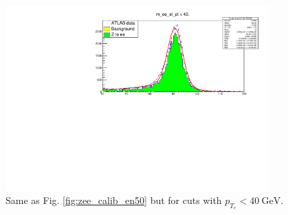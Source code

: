 \documentclass[a4paper]{report}
\numberwithin{equation}{section}
\begin{document}
\begin{figure}[htpb]
    \centering
    \includegraphics[width=0.9\textwidth]{zeefit_elpt40.pdf}
    \caption{Same as Fig. \ref*{fig:zee_calib_en50} but for cuts with $p_{T_e} < \SI{40}{\giga\electronvolt}$.}
    \label{fig:zee_calib_pt40}
\end{figure}
\end{document}
